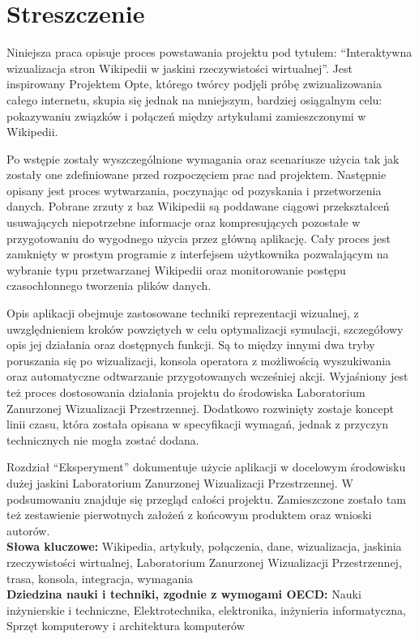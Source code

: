 \chapter*{Streszczenie}
Niniejsza praca opisuje proces powstawania projektu pod tytułem: ``Interaktywna wizualizacja stron Wikipedii w jaskini rzeczywistości wirtualnej''. Jest inspirowany Projektem Opte, którego twórcy podjęli próbę zwizualizowania całego internetu, skupia się jednak na mniejszym, bardziej osiągalnym celu: pokazywaniu związków i połączeń między artykułami zamieszczonymi w Wikipedii. 

Po wstępie zostały wyszczególnione wymagania oraz scenariusze użycia tak jak zostały one zdefiniowane przed rozpoczęciem prac nad projektem. Następnie opisany jest proces wytwarzania, poczynając od pozyskania i przetworzenia danych. Pobrane zrzuty z baz Wikipedii są poddawane ciągowi przekształceń usuwających niepotrzebne informacje oraz kompresujących pozostałe w przygotowaniu do wygodnego użycia przez główną aplikację. Cały proces jest zamknięty w prostym programie z interfejsem użytkownika pozwalającym na wybranie typu przetwarzanej Wikipedii oraz monitorowanie postępu czasochłonnego tworzenia plików danych.

Opis aplikacji obejmuje zastosowane techniki reprezentacji wizualnej, z uwzględnieniem kroków powziętych w celu optymalizacji symulacji, szczegółowy opis jej działania oraz dostępnych funkcji. Są to między innymi dwa tryby poruszania się po wizualizacji, konsola operatora z możliwością wyszukiwania oraz automatyczne odtwarzanie przygotowanych wcześniej akcji. Wyjaśniony jest też proces dostosowania działania projektu do środowiska Laboratorium Zanurzonej Wizualizacji Przestrzennej. Dodatkowo rozwinięty zostaje koncept linii czasu, która została opisana w specyfikacji wymagań, jednak z przyczyn technicznych nie mogła zostać dodana.

Rozdział ``Eksperyment'' dokumentuje użycie aplikacji w docelowym środowisku dużej jaskini Laboratorium Zanurzonej Wizualizacji Przestrzennej. W podsumowaniu znajduje się przegląd całości projektu. Zamieszczone zostało tam też zestawienie pierwotnych założeń z końcowym produktem oraz wnioski autorów.\\

\noindent\textbf{Słowa kluczowe:} Wikipedia, artykuły, połączenia, dane, wizualizacja, jaskinia rzeczywistości wirtualnej, Laboratorium Zanurzonej Wizualizacji Przestrzennej, trasa, konsola, integracja, wymagania \\

\noindent\textbf{Dziedzina nauki i techniki, zgodnie z wymogami OECD:} Nauki inżynierskie i techniczne, Elektrotechnika, elektronika, inżynieria informatyczna, Sprzęt komputerowy i architektura komputerów
